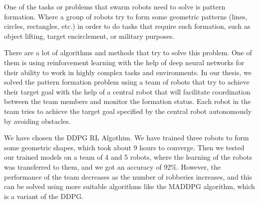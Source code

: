 \documentclass[12pt]{extarticle}
\begin{document}
One of the tasks or problems that swarm robots need to solve is pattern formation. Where a group of robots try to form some geometric patterns (lines, circles, rectangles, etc.) in order to do tasks that require such formation, such as object lifting, target encirclement, or military purposes.

There are a lot of algorithms and methods that try to solve this problem. One of them is using reinforcement learning with the help of deep neural networks for their ability to work in highly complex tasks and environments.
In our thesis, we solved the pattern formation problem using a team of robots that try to achieve their target goal with the help of a central robot that will facilitate coordination between the team members and monitor the formation status. Each robot in the team tries to achieve the target goal specified by the central robot autonomously by avoiding obstacles.


We have chosen the DDPG RL Algothim. We have trained three robots to form some geometric shapes, which took about 9 hours to converge.
Then we tested our trained models on a team of 4 and 5 robots, where the learning of the robots was transferred to them, and we got an accuracy of 92\%.
However, the performance of the team decreases as the number of robberies increases, and this can be solved using more suitable algorithms like the MADDPG algorithm, which is a variant of the DDPG.







\newpage


\end{document}
